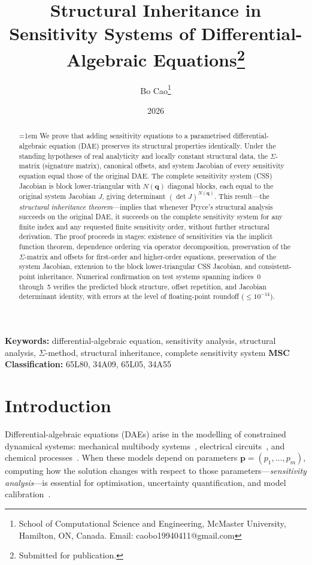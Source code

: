 \documentclass[12pt,a4paper]{article}
\title{\bfseries Structural Inheritance in Sensitivity Systems of Differential-Algebraic Equations\thanks{Submitted for publication.}}
\author{Bo Cao\thanks{School of Computational Science and Engineering, McMaster University, Hamilton, ON, Canada. Email: caobo19940411@gmail.com}}
\date{2026}
\theoremstyle{definition}
\theoremstyle{plain}
\theoremstyle{remark}
\newcommand{\vp}{\mathbf{p}}
\newcommand{\vq}{\mathbf{q}}
\newcommand{\keywords}[1]{\noindent\textbf{Keywords:} #1}
\newcommand{\MSC}[1]{\noindent\textbf{MSC Classification:} #1}
\begin{document}
\maketitle

\begin{abstract}
\emergencystretch=1em
We prove that adding sensitivity equations to a parametrised differential-algebraic equation (DAE) preserves its structural properties identically. Under the standing hypotheses of real analyticity and locally constant structural data, the $\Sigma$-matrix (signature matrix), canonical offsets, and system Jacobian of every sensitivity equation equal those of the original DAE. The complete sensitivity system (CSS) Jacobian is block lower-triangular with $N(\vq)$ diagonal blocks, each equal to the original system Jacobian $J$, giving determinant $(\det J)^{N(\vq)}$. This result---the \emph{structural inheritance theorem}---implies that whenever Pryce's structural analysis succeeds on the original DAE, it succeeds on the complete sensitivity system for any finite index and any requested finite sensitivity order, without further structural derivation. The proof proceeds in stages: existence of sensitivities via the implicit function theorem, dependence ordering via operator decomposition, preservation of the $\Sigma$-matrix and offsets for first-order and higher-order equations, preservation of the system Jacobian, extension to the block lower-triangular CSS Jacobian, and consistent-point inheritance. Numerical confirmation on test systems spanning indices~0 through~5 verifies the predicted block structure, offset repetition, and Jacobian determinant identity, with errors at the level of floating-point roundoff ($\le 10^{-14}$).
\end{abstract}
\emergencystretch=0pt

\keywords{differential-algebraic equation, sensitivity analysis, structural analysis, $\Sigma$-method, structural inheritance, complete sensitivity system}
\MSC{65L80, 34A09, 65L05, 34A55}

\section{Introduction}

Differential-algebraic equations (DAEs) arise in the modelling of constrained dynamical systems: mechanical multibody systems~\cite{arnold1995numerical}, electrical circuits~\cite{gunther2000differential}, and chemical processes~\cite{pantelides1988consistent}. When these models depend on parameters $\vp = (p_1,\dots,p_m)$, computing how the solution changes with respect to those parameters---\emph{sensitivity analysis}---is essential for optimisation, uncertainty quantification, and model calibration~\cite{rabitz1999efficient}.
\end{document}
